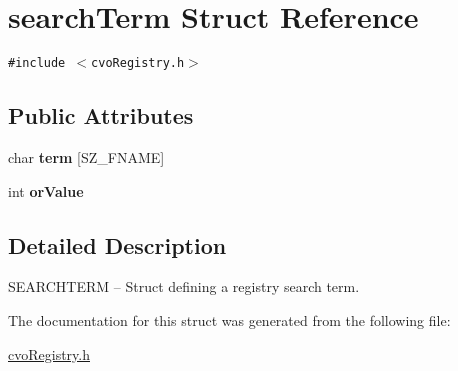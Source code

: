 \hypertarget{structsearchTerm}{
\section{searchTerm Struct Reference}
\label{structsearchTerm}
}
{\tt \#include $<$cvoRegistry.h$>$}

\subsection*{Public Attributes}
\begin{CompactItemize}
\item 
\hypertarget{structsearchTerm_51eecedace74c67c04e8f1bbabd0af70}{
char \textbf{term} \mbox{[}SZ\_\-FNAME\mbox{]}}
\label{structsearchTerm_51eecedace74c67c04e8f1bbabd0af70}

\item 
\hypertarget{structsearchTerm_8220afd75ec1cc43e4034684a8b58c97}{
int \textbf{orValue}}
\label{structsearchTerm_8220afd75ec1cc43e4034684a8b58c97}

\end{CompactItemize}


\subsection{Detailed Description}
SEARCHTERM -- Struct defining a registry search term. 

The documentation for this struct was generated from the following file:\begin{CompactItemize}
\item 
\hyperlink{cvoRegistry_8h}{cvoRegistry.h}\end{CompactItemize}
